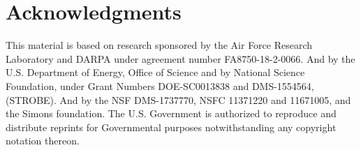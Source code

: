 \documentclass{article}
\begin{document}
\section*{Acknowledgments}
This material is based on research sponsored by the Air Force Research Laboratory and DARPA under agreement number FA8750-18-2-0066. And by the U.S. Department of Energy,
Office of Science and by National Science Foundation, under Grant Numbers DOE-SC0013838
and DMS-1554564, (STROBE). And by the NSF DMS-1737770, NSFC 11371220 and 11671005, and the Simons foundation. The U.S. Government is authorized to reproduce and distribute reprints for Governmental purposes notwithstanding any copyright notation thereon.

%
%
\end{document}
